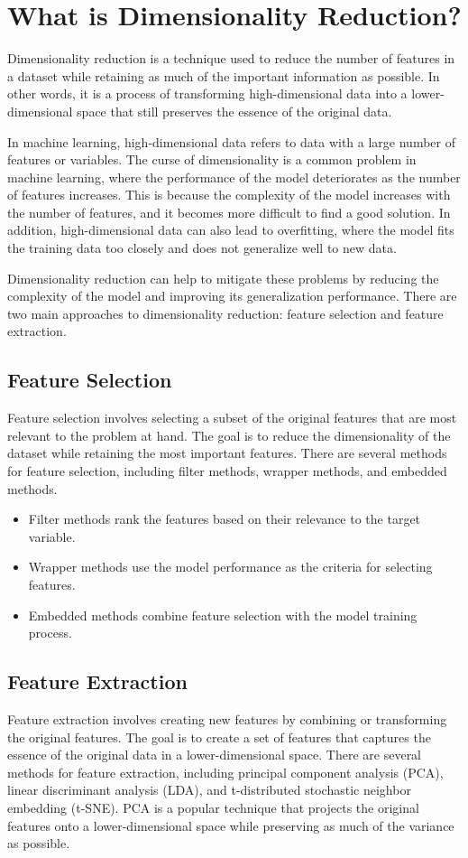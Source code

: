 \section{What is Dimensionality Reduction?}
    Dimensionality reduction is a technique used to reduce the number of features in a dataset while retaining as much of the important information as possible. In other words, it is a process of transforming high-dimensional data into a lower-dimensional space that still preserves the essence of the original data.

    In machine learning, high-dimensional data refers to data with a large number of features or variables. The curse of dimensionality is a common problem in machine learning, where the performance of the model deteriorates as the number of features increases. This is because the complexity of the model increases with the number of features, and it becomes more difficult to find a good solution. In addition, high-dimensional data can also lead to overfitting, where the model fits the training data too closely and does not generalize well to new data.

    Dimensionality reduction can help to mitigate these problems by reducing the complexity of the model and improving its generalization performance. There are two main approaches to dimensionality reduction: feature selection and feature extraction.

    \subsection{Feature Selection}
        Feature selection involves selecting a subset of the original features that are most relevant to the problem at hand. The goal is to reduce the dimensionality of the dataset while retaining the most important features. There are several methods for feature selection, including filter methods, wrapper methods, and embedded methods. 
        \begin{itemize}
            \item Filter methods rank the features based on their relevance to the target variable.
            \item Wrapper methods use the model performance as the criteria for selecting features. 
            \item Embedded methods combine feature selection with the model training process.
        \end{itemize}
    \subsection{Feature Extraction}
        Feature extraction involves creating new features by combining or transforming the original features. The goal is to create a set of features that captures the essence of the original data in a lower-dimensional space. There are several methods for feature extraction, including principal component analysis (PCA), linear discriminant analysis (LDA), and t{-}distributed stochastic neighbor embedding (t{-}SNE). PCA is a popular technique that projects the original features onto a lower-dimensional space while preserving as much of the variance as possible.
